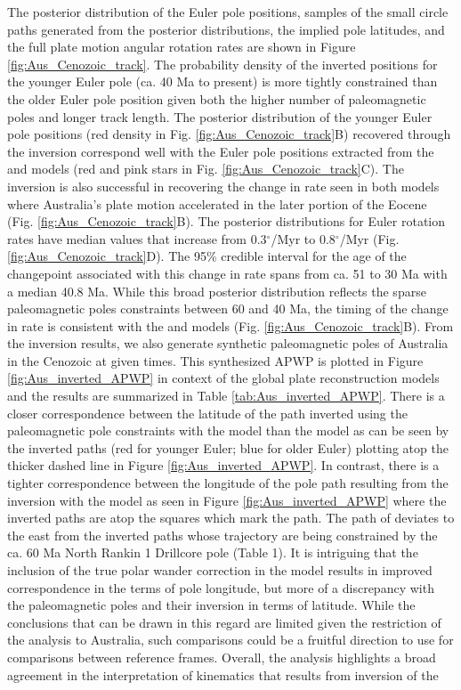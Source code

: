 \documentclass[11pt,letterpaper]{article}
\begin{document}
The posterior distribution of the Euler pole positions, samples of the small circle paths generated from the posterior distributions, the implied pole latitudes, and the full plate motion angular rotation rates are shown in Figure \ref{fig:Aus_Cenozoic_track}. The probability density of the inverted positions for the younger Euler pole (ca. 40 Ma to present) is more tightly constrained than the older Euler pole position given both the higher number of paleomagnetic poles and longer track length. The posterior distribution of the younger Euler pole positions (red density in Fig. \ref{fig:Aus_Cenozoic_track}B) recovered through the inversion correspond well with the Euler pole positions extracted from the \cite{Muller2016a} and \cite{Torsvik2017a} models (red and pink stars in Fig. \ref{fig:Aus_Cenozoic_track}C). The inversion is also successful in recovering the change in rate seen in both models where Australia's plate motion accelerated in the later portion of the Eocene (Fig. \ref{fig:Aus_Cenozoic_track}B). The posterior distributions for Euler rotation rates have median values that increase from 0.3$^\circ$/Myr to 0.8$^\circ$/Myr (Fig. \ref{fig:Aus_Cenozoic_track}D). The 95\% credible interval for the age of the changepoint associated with this change in rate spans from ca. 51 to 30 Ma with a median 40.8 Ma. While this broad posterior distribution reflects the sparse paleomagnetic poles constraints between 60 and 40 Ma, the timing of the change in rate is consistent with the \cite{Muller2016a} and \cite{Torsvik2017a} models (Fig. \ref{fig:Aus_Cenozoic_track}B). From the inversion results, we also generate synthetic paleomagnetic poles of Australia in the Cenozoic at given times. This synthesized APWP is plotted in Figure \ref{fig:Aus_inverted_APWP} in context of the global plate reconstruction models and the results are summarized in Table \ref{tab:Aus_inverted_APWP}. There is a closer correspondence between the latitude of the path inverted using the paleomagnetic pole constraints with the \cite{Muller2016a} model than the \cite{Torsvik2017a} model as can be seen by the inverted paths (red for younger Euler; blue for older Euler) plotting atop the thicker dashed line in Figure \ref{fig:Aus_inverted_APWP}. In contrast, there is a tighter correspondence between the longitude of the pole path resulting from the inversion with the \cite{Torsvik2017a} model as seen in Figure \ref{fig:Aus_inverted_APWP} where the inverted paths are atop the squares which mark the \cite{Torsvik2017a} path. The path of \cite{Muller2016a} deviates to the east from the inverted paths whose trajectory are being constrained by the ca. 60 Ma North Rankin 1 Drillcore pole (Table 1). It is intriguing that the inclusion of the \cite{Doubrovine2012a} true polar wander correction in the \cite{Torsvik2017a} model results in improved correspondence in the terms of pole longitude, but more of a discrepancy with the paleomagnetic poles and their inversion in terms of latitude. While the conclusions that can be drawn in this regard are limited given the restriction of the analysis to Australia, such comparisons could be a fruitful direction to use for comparisons between reference frames. Overall, the analysis highlights a broad agreement in the interpretation of kinematics that results from inversion of the 
\end{document}
